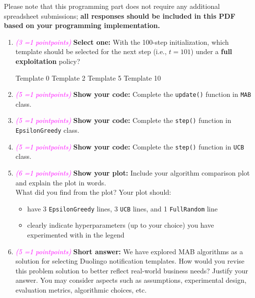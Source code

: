 \documentclass[11pt, letter, answers]{exam}
\newcommand{\grade}[1]{
    \small\textcolor{magenta}{\emph{(#1 \ifnum#1=1 point\else points\fi)}}%
    \normalsize
}
\newcommand{\sOne}{\textbf{Select one: }}
\newcommand{\saq}{\textbf{Short answer: }}
\newcommand{\sCode}{\textbf{Show your code: }}
\newcommand{\sPlot}{\textbf{Show your plot: }}
\begin{document}
Please note that this programming part does not require any additional spreadsheet submissions; \textbf{all responses should be included in this PDF based on your programming implementation.}

\vspace{1em}
\begin{enumerate}[label=(\alph*)]

\item \grade{3} \sOne With the 100-step initialization, which template should be selected for the next step (i.e., $t=101$) under a \textbf{full exploitation} policy?
\begin{checkboxes}
    \choice Template 0
    \choice Template 2
    \choice Template 5
    \choice Template 10
\end{checkboxes}


\newpage
\item \grade{5} \sCode Complete the \texttt{update()} function in \texttt{MAB} class. 
\begin{codeBox}[height=2.6in]

\end{codeBox}


\item \grade{5} \sCode Complete the \texttt{step()} function in \texttt{EpsilonGreedy} class.
\begin{codeBox}[height=2.6in]

\end{codeBox}


\item \grade{5} \sCode Complete the \texttt{step()} function in \texttt{UCB} class.
\begin{codeBox}[height=2.6in]

\end{codeBox}


\item \grade{6} \sPlot Include your algorithm comparison plot and explain the plot in words. \\What did you find from the plot? Your plot should:
\begin{itemize}
    \item have 3 \texttt{EpsilonGreedy} lines, 3 \texttt{UCB} lines, and 1 \texttt{FullRandom} line
    \item clearly indicate hyperparameters (up to your choice) you have experimented with in the legend
\end{itemize}
\begin{answerBox}[height=4.5in]
    
\end{answerBox}


\item \grade{5} \saq We have explored MAB algorithms as a solution for selecting Duolingo notification templates. How would you revise this problem solution to better reflect real-world business needs? Justify your answer. You may consider aspects such as assumptions, experimental design, evaluation metrics, algorithmic choices, etc.
\begin{answerBox}[height=2.6in]

\end{answerBox}

\end{enumerate}
\end{document}
